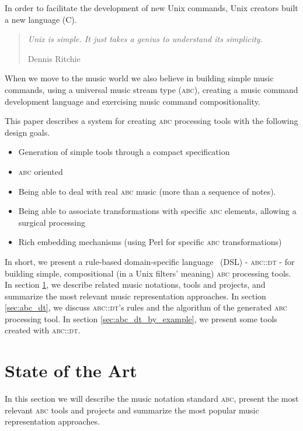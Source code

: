 \documentclass[a4paper,UKenglish]{oasics}
\newcommand{\abc}{\textsc{abc}}
\newcommand{\abcpt}{\abc{} processing tool}
\newcommand{\abcdt}{\textsc{abc::dt}}
\begin{document}
In order to facilitate the development of new Unix commands, Unix creators built a new language (C).

\begin{quotation}
  \small\textit{Unix is simple. It just takes a genius to understand its simplicity.}
  \begin{flushright}
    Dennis Ritchie
  \end{flushright}
\end{quotation}

When we move to the music world we also believe in building simple music commands, using a universal
music stream type (\abc{}), creating a music command development language and exercising music
command compositionality.

This paper describes a system for creating \abcpt{}s with the following design goals.

\begin{itemize}
  \item Generation of simple tools through a compact specification
  \item \abc{} oriented
  \item Being able to deal with real \abc{} music (more than a sequence of notes).
  \item Being able to associate transformations with specific \abc{} elements, allowing a surgical
  processing
  \item Rich embedding mechanisms (using Perl for specific \abc{} transformations)
\end{itemize}

In short, we present a rule-based domain-specific
language~\cite{kosar2010comparing,kosar2008preliminary} (DSL) - \abcdt{} - for building simple,
compositional (in a Unix filters' meaning) \abcpt{}s.  In section \ref{sec:state_art},
we describe related music notations, tools and projects, and summarize the most relevant music
representation approaches. In section \ref{sec:abc_dt}, we discuss \abcdt{}'s rules and the
algorithm of the generated \abcpt{}. In section \ref{sec:abc_dt_by_example}, we
present some tools created with \abcdt{}.

\section{State of the Art}
\label{sec:state_art}

In this section we will describe the music notation standard \abc{}, present the most relevant \abc
tools and projects and summarize the most popular music representation approaches.
\end{document}
